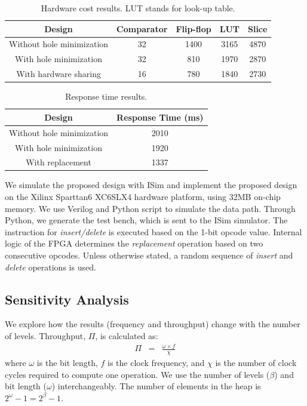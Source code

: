 \documentclass[10pt, conference, compsocconf]{IEEEtran}
\begin{document}
\begin{table}[!ht]
 \begin{center}
 \caption{Hardware cost results. LUT stands for look-up table.}
\label{table2}
\begin{tabular}{|c|c|c|c|c|}
 \hline
 Design  & Comparator  & Flip-flop & LUT &Slice \\
 \hline
 \hline
Without hole minimization & 32 & 1400 & 3165 & 4870 \\
 \hline
With hole minimization & 32 & 810 & 1970 & 2870 \\
  \hline
With hardware sharing & 16 & 780 & 1840 & 2730 \\
\hline
\end{tabular}
\end{center}
\end{table}

\begin{table}[!ht]
 \begin{center}
 \caption{Response time results.}
\label{table3}
\begin{tabular}{ |c|c|}
 \hline
 Design  &  Response Time (ms) \\
 \hline
Without hole minimization & 2010 \\
  \hline
With hole minimization & 1920 \\
  \hline
With replacement & 1337 \\
  \hline
\end{tabular}
\end{center}
\end{table}

We simulate the proposed design with ISim and implement the proposed design on the Xilinx Sparttan6 XC6SLX4 hardware platform, using 32MB on-chip memory.
We use Verilog and Python script to simulate the data path.
Through Python, we generate the test bench, which is sent to the ISim simulator.
The instruction for {\it insert/delete} is executed based on the 1-bit opcode value.
Internal logic of the FPGA determines the {\it replacement} operation based on two consecutive opcodes.
Unless otherwise stated, a random sequence of {\it insert} and {\it delete} operations is used.

\subsection{Sensitivity Analysis}
We explore how the results (frequency and throughput) change with the number of levels.
Throughput, $\Pi$, is calculated as:
\begin{eqnarray}
\Pi &=&  \frac{\omega \times  f}{\chi}
\end{eqnarray}
 where $\omega$ is the bit length, $f$ is the clock frequency, and $\chi$ is the number of clock cycles required to compute one operation.
We use the number of levels ($\beta$) and bit length ($\omega$) interchangeably.
The number of elements in the heap is $2^\omega-1 = 2^\beta -1$.
\end{document}
